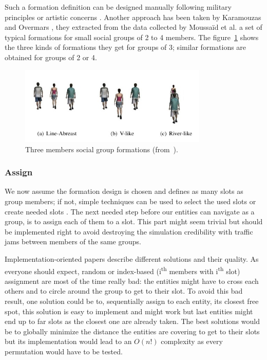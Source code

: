 \documentclass[a4paper,titlepage]{article}
\begin{document}
Such a formation definition can be designed manually following military principles or artistic concerns \cite{Dawson:2002vd}.  Another approach has been taken by Karamouzas and Overmars \cite{Karamouzas:2010fi}, they extracted from the data collected by Moussaïd et al. \cite{Moussaid:2010ib} a set of typical formations for small social groups of 2 to 4 members. The figure~\ref{fig:social_group_formations} shows the three kinds of formations they get for groups of 3; similar formations are obtained for groups of 2 or 4. 

\begin{figure}[h]
\centering
\includegraphics[width=0.8\textwidth]{SocialGroupFormations.jpg}
\caption{Three members social group formations (from~\cite{Karamouzas:2010fi}).}
\label{fig:social_group_formations}
\end{figure} 

\subsubsection{Assign}
We now assume the formation design is chosen and defines as many slots as group members; if not, simple techniques can be used to select the used slots or create needed slots \cite{Silveira:2008bc}. The next needed step before our entities can navigate as a group, is to assign each of them to a slot. This part might seem trivial but should be implemented right to avoid destroying the simulation credibility with traffic jams between members of the same groups.

Implementation-oriented papers \cite{Dawson:2002vd,Millington:2006wz} describe different solutions and their quality. As everyone should expect, random or index-based (i\textsuperscript{th} members with i\textsuperscript{th} slot) assignment are most of the time really bad: the entities might have to cross each others and to circle around the group to get to their slot. To avoid this bad result, one solution could be to, sequentially assign to each entity, its closest free spot, this solution is easy to implement and might work but last entities might end up to far slots as the closest one are already taken. The best solutions would be to globally minimize the distance the entities are covering to get to their slots but its implementation would lead to an $O(n!)$ complexity as every permutation would have to be tested. 
\end{document}
